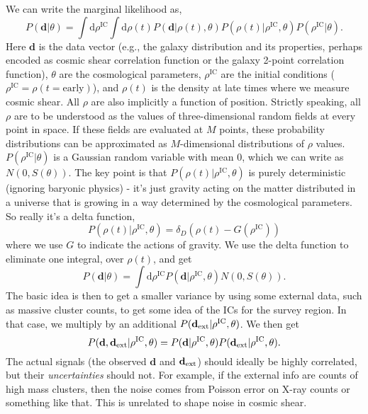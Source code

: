 \documentclass[preprint]{aastex}
\newcommand{\data}{\mathbf{d}}
\newcommand{\dataext}{\data_{\rm ext}}
\begin{document}
We can write the marginal likelihood as,
\begin{equation}
	P(\data|\theta) = \int \mathrm{d}\rho^\text{IC}\int \mathrm{d}\rho(t) P(\data|\rho(t),\theta)
	P(\rho(t)|\rho^\text{IC},\theta) P(\rho^\text{IC}|\theta).
\end{equation}
Here $\data$ is the data vector (e.g., the galaxy distribution and its properties, perhaps encoded
as cosmic shear correlation function or the galaxy 2-point
correlation function), $\theta$ are the cosmological parameters, $\rho^\text{IC}$ are the initial
conditions ($\rho^\text{IC}=\rho(t=\text{early})$), and $\rho(t)$ is the density at late times where we measure cosmic
shear.  All $\rho$ are also implicitly a function of position. Strictly speaking, all $\rho$ are to be understood as the values of three-dimensional random fields at every point in space. If these fields are evaluated at $M$ points, these probability distributions can be approximated as $M$-dimensional distributions of $\rho$ values. 
$P(\rho^\text{IC}|\theta)$ is a Gaussian random variable with mean $0$, which we can write as $N(0,S(\theta))$.  The key point is that
$P(\rho(t)|\rho^\text{IC},\theta)$ is purely deterministic (ignoring baryonic physics) - it's just
gravity acting on the matter distributed in a universe that is growing in a way determined by the
cosmological parameters.  So really it's a delta function,
\begin{equation}
	P(\rho(t)|\rho^\text{IC},\theta) = \delta_D(\rho(t)-G(\rho^\text{IC}))
\end{equation} 
where we use $G$ to indicate the actions of gravity.  We use the delta function to eliminate one
integral, over $\rho(t)$, and get
\begin{equation}
	P(\data|\theta) = \int \mathrm{d}\rho^\text{IC}  P(\data|\rho^\text{IC},\theta)N(0,S(\theta)).
\end{equation}
The basic idea is then to get a smaller variance by using some external data, such as massive
cluster counts, to get some idea of the ICs for the survey region.  In that case, we multiply by an
additional $P(\dataext|\rho^\text{IC},\theta)$.  We then get
\begin{equation}
	P(\data,\dataext|\rho^\text{IC},\theta) = P(\data|\rho^\text{IC},\theta)P(\dataext|\rho^\text{IC},\theta).
\end{equation}
The actual signals (the observed $\data$ and $\dataext$) should ideally be highly
correlated, but their {\em uncertainties} should not.  For example, if the external info are counts
of high mass clusters, then the noise comes from Poisson error on X-ray counts or something like
that.  This is unrelated to shape noise in cosmic shear.
\end{document}
